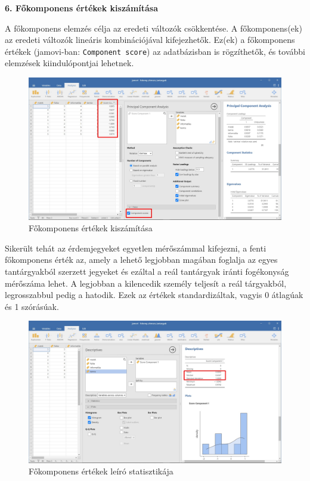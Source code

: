 \documentclass[
  letterpaper,
]{krantz}
\begin{document}
\textbf{6. Főkomponens értékek kiszámítása}

A főkomponens elemzés célja az eredeti változók csökkentése. A
főkomponens(ek) az eredeti változók lineáris kombinációjával
kifejezhetők. Ez(ek) a főkomponens értékek (jamovi-ban:
\texttt{Component\ score}) az adatbázisban is rögzíthetők, és további
elemzések kiindulópontjai lehetnek.

\begin{figure}

{\centering \includegraphics{./images/fokomponens_kep_05.jpg}

}

\caption{Főkomponens értékek kiszámítása}

\end{figure}

Sikerült tehát az érdemjegyeket egyetlen mérőszámmal kifejezni, a fenti
főkomponens érték az, amely a lehető legjobban magában foglalja az egyes
tantárgyakból szerzett jegyeket és ezáltal a reál tantárgyak iránti
fogékonyság mérőszáma lehet. A legjobban a kilencedik személy teljesít a
reál tárgyakból, legrosszabbul pedig a hatodik. Ezek az értékek
standardizáltak, vagyis 0 átlagúak és 1 szórásúak.

\begin{figure}

{\centering \includegraphics{./images/fokomponens_kep_06.jpg}

}

\caption{Főkomponens értékek leíró statisztikája}

\end{figure}
\end{document}
